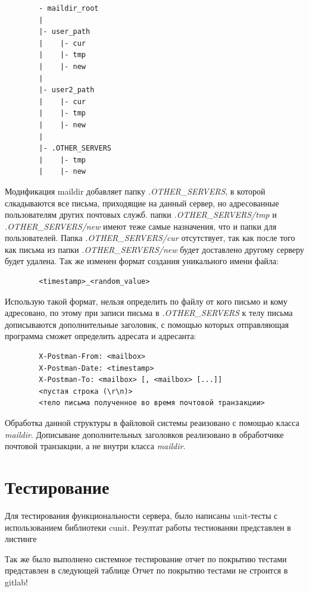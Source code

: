 \documentclass[a4paper,12pt]{report}
\begin{document}
        \begin{verbatim}
        - maildir_root
        |
        |- user_path
        |    |- cur
        |    |- tmp
        |    |- new
        |
        |- user2_path
        |    |- cur
        |    |- tmp
        |    |- new
        |
        |- .OTHER_SERVERS
        |    |- tmp
        |    |- new
    \end{verbatim}
    Модификация maildir добавляет папку \textit{.OTHER\_SERVERS}, в которой слкадываются все письма, приходящие на данный сервер, но адресованные пользователям других почтовых служб. папки \textit{.OTHER\_SERVERS/tmp} и  \textit{.OTHER\_SERVERS/new} имеют теже самые назначения, что и папки для пользователей. Папка \textit{.OTHER\_SERVERS/cur} отсутствует, так как после того как письма из папки \textit{.OTHER\_SERVERS/new} будет доставлено другому серверу будет удалена. Так же изменен формат создания уникального имени файла:
    \begin{verbatim}
        <timestamp>_<random_value>
    \end{verbatim}
    Использую такой формат, нельзя определить по файлу от кого письмо и кому адресовано, по этому при записи письма в \textit{.OTHER\_SERVERS} к телу письма дописываются дополнительные заголовик, с помощью которых отправляющая программа сможет определить адресата и адресанта:
    \begin{verbatim}
        X-Postman-From: <mailbox>
        X-Postman-Date: <timestamp>
        X-Postman-To: <mailbox> [, <mailbox> [...]]
        <пустая строка (\r\n)>
        <тело письма полученное во время почтовой транзакции>
    \end{verbatim}
    
    Обработка данной структуры в файловой системы реаизовано с помощью класса \textit{maildir}. Дописыване дополнительных заголовков реализовано в обработчике почтовой транзакции, а не внутри класса \textit{maildir}.

	 
	\section{Тестирование}
		Для тестирования функциональности сервера, было написаны unit-тесты
		с использованием библиотеки cunit. Резултат работы тестиованяи представлен
		в листинге 
		
		Так же было выполнено системное тестирование
		отчет по покрытию тестами представлен в следующей таблице
		Отчет по покрытию тестами не строится в  gitlab!
\end{document}
